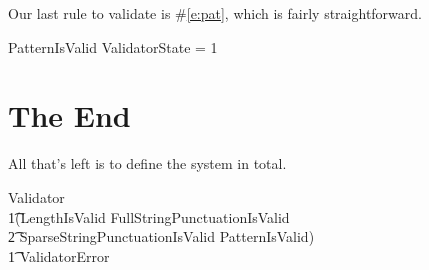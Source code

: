 \documentclass[11pt]{article}
\begin{document}
\begin{spec}
  Our last rule to validate is \#\ref{e:pat}, which is fairly straightforward.

  \begin{schema}{PatternIsValid}
    ValidatorState
     = 1
  \end{schema}

  \section{The End}

  All that's left is to define the system in total.

  \begin{zed}
    Validator  \\
    \t1(LengthIsValid \land FullStringPunctuationIsValid \land \\
    \t2 SparseStringPunctuationIsValid \land PatternIsValid) \lor \\
    \t1 ValidatorError
  \end{zed}
  
  
\end{spec}
\end{document}
